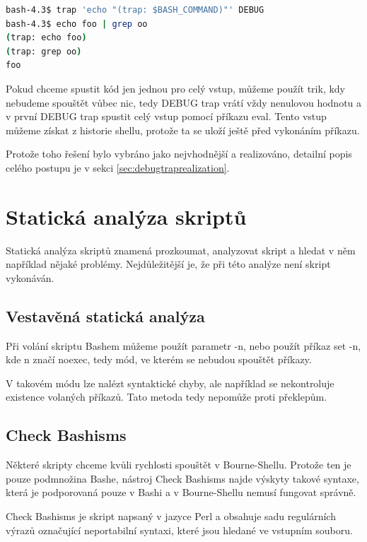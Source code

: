 \documentclass[thesis=M,czech]{FITthesis}[2012/06/26]
\begin{document}
\begin{lstlisting}[language=bash, caption={DEBUG trap}, label={lst:debugtrap}]
bash-4.3$ trap 'echo "(trap: $BASH_COMMAND)"' DEBUG
bash-4.3$ echo foo | grep oo
(trap: echo foo)
(trap: grep oo)
foo
\end{lstlisting}

Pokud chceme spustit kód jen jednou pro celý vstup, můžeme použít trik, kdy nebudeme spouštět vůbec nic, tedy DEBUG trap vrátí vždy nenulovou hodnotu a v první DEBUG trap spustit celý vstup pomocí příkazu eval. Tento vstup můžeme získat z historie shellu, protože ta se uloží ještě před vykonáním příkazu.

Protože toho řešení bylo vybráno jako nejvhodnější a realizováno, detailní popis celého postupu je v sekci \ref{sec:debugtraprealization}.




\section{Statická analýza skriptů}

Statická analýza skriptů znamená prozkoumat, analyzovat skript a hledat v něm například nějaké problémy. Nejdůležitější je, že při této analýze není skript vykonáván.


%
%
\subsection{Vestavěná statická analýza}

Při volání skriptu Bashem můžeme použít parametr -n, nebo použít příkaz set -n, kde n značí noexec, tedy mód, ve kterém se nebudou spouštět příkazy.

V takovém módu lze nalézt syntaktické chyby, ale například se nekontroluje existence volaných příkazů. Tato metoda  tedy nepomůže proti překlepům.


%
%
\subsection{Check Bashisms}

Některé skripty chceme kvůli rychlosti spouštět v Bourne-Shellu. Protože ten je pouze podmnožina Bashe, nástroj Check Bashisms najde výskyty takové syntaxe, která je podporovaná pouze v Bashi a v Bourne-Shellu nemusí fungovat správně.

Check Bashisms je skript napsaný v jazyce Perl a obsahuje sadu regulárních výrazů označující neportabilní syntaxi, které jsou hledané ve vstupním souboru.
\end{document}

